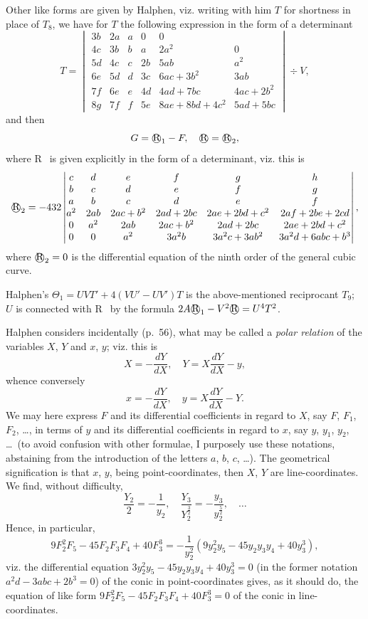 \documentclass[11pt,a4paper]{book}
\begin{document}
Other like forms are given by Halphen, viz.
writing with him $T$ for shortness in place of $T_8$, we have for $T$ the following expression in the form of a determinant
\[
T = \begin{vmatrix}
3b & 2a & a & 0 & 0 \\
4c & 3b & b & a & 2a^2 & 0 \\
5d & 4c & c & 2b & 5ab & a^2 \\
6e & 5d & d & 3c & 6ac + 3b^2 & 3ab \\
7f & 6e & e & 4d & 4ad + 7bc & 4ac + 2b^2 \\
8g & 7f & f & 5e & 8ae + 8bd + 4c^2 & 5ad + 5bc
\end{vmatrix} \div V,
\]
and then
\[
G = \text{\textcircled{R}}_1 - F, \quad \text{\textcircled{R}} = \text{\textcircled{R}}_2,
\]
where \textcircled{R}\ is given explicitly in the form of a determinant, viz.
this is
\[
\text{\textcircled{R}}_2 = -432 \begin{vmatrix}
c & d & e & f & g & h \\
b & c & d & e & f & g \\
a & b & c & d & e & f \\
a^2 & 2ab & 2ac+b^2 & 2ad+2bc & 2ae+2bd+c^2 & 2af+2be+2cd \\
0 & a^2 & 2ab & 2ac+b^2 & 2ad+2bc & 2ae+2bd+c^2 \\
0 & 0 & a^2 & 3a^2b & 3a^2c+3ab^2 & 3a^2d+6abc+b^3
\end{vmatrix},
\]
where $\text{\textcircled{R}}_2 = 0$ is the differential equation of the ninth order of the general cubic curve.

Halphen's $\Theta_1 = UVT' + 4(VU' - UV')T$ is the above-mentioned reciprocant $T_9$; $U$ is connected with \textcircled{R}\ by the formula $2A\text{\textcircled{R}}_1 - V^2\text{\textcircled{R}} = U^4T^2$.

Halphen considers incidentally (p.~56), what may be called a \textit{polar relation} of the variables $X$, $Y$ and $x$, $y$; viz.
this is
\[
X = -\frac{dY}{dX}, \quad Y = X\frac{dY}{dX} - y,
\]
whence conversely
\[
x = -\frac{dY}{dX}, \quad y = X\frac{dY}{dX} - Y.
\]
We may here express $F$ and its differential coefficients in regard to $X$, say $F$, $F_1$, $F_2$, \dots, in terms of $y$ and its differential coefficients in regard to $x$, say $y$, $y_1$, $y_2$, \dots\ (to avoid confusion with other formulae, I purposely use these notations, abstaining from the introduction of the letters $a$, $b$, $c$, \dots).
The geometrical signification is that $x$, $y$, being point-coordinates, then $X$, $Y$ are line-coordinates.
We find, without difficulty,
\[
\frac{Y_2}{2} = -\frac{1}{y_2}, \quad \frac{Y_3}{Y_2^{\frac{3}{2}}} = -\frac{y_3}{y_2^{\frac{5}{2}}}, \quad \dots
\]
Hence, in particular,
\[
9F_2^2F_5 - 45F_2F_3F_4 + 40F_3^3 = -\frac{1}{y_2^2}(9y_2^2y_5 - 45y_2y_3y_4 + 40y_3^3),
\]
viz.
the differential equation $3y_2^2y_5 - 45y_2y_3y_4 + 40y_3^3 = 0$ (in the former notation $a^2d - 3abc + 2b^3 = 0$) of the conic in point-coordinates gives, as it should do, the equation of like form $9F_2^2F_5 - 45F_2F_3F_4 + 40F_3^3 = 0$ of the conic in line-coordinates.
\end{document}
